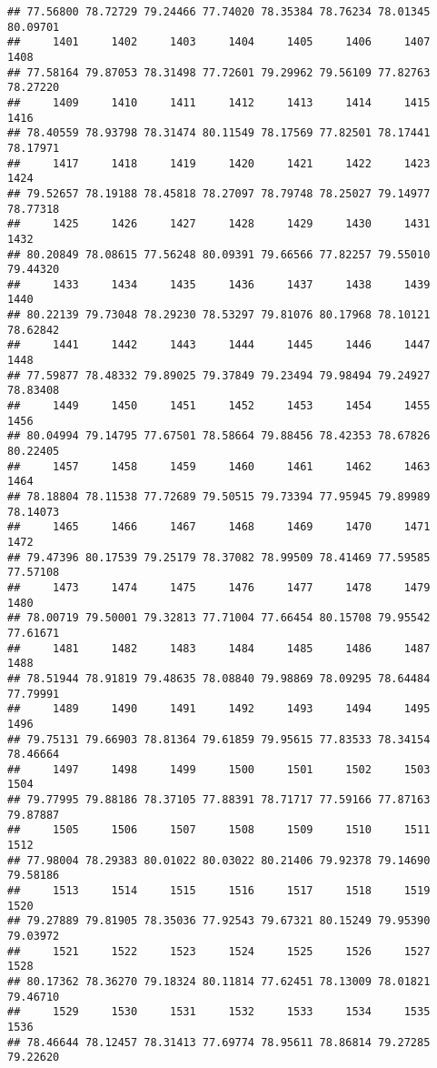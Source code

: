 \documentclass[
]{article}
\begin{document}
\begin{verbatim}
## 77.56800 78.72729 79.24466 77.74020 78.35384 78.76234 78.01345 80.09701 
##     1401     1402     1403     1404     1405     1406     1407     1408 
## 77.58164 79.87053 78.31498 77.72601 79.29962 79.56109 77.82763 78.27220 
##     1409     1410     1411     1412     1413     1414     1415     1416 
## 78.40559 78.93798 78.31474 80.11549 78.17569 77.82501 78.17441 78.17971 
##     1417     1418     1419     1420     1421     1422     1423     1424 
## 79.52657 78.19188 78.45818 78.27097 78.79748 78.25027 79.14977 78.77318 
##     1425     1426     1427     1428     1429     1430     1431     1432 
## 80.20849 78.08615 77.56248 80.09391 79.66566 77.82257 79.55010 79.44320 
##     1433     1434     1435     1436     1437     1438     1439     1440 
## 80.22139 79.73048 78.29230 78.53297 79.81076 80.17968 78.10121 78.62842 
##     1441     1442     1443     1444     1445     1446     1447     1448 
## 77.59877 78.48332 79.89025 79.37849 79.23494 79.98494 79.24927 78.83408 
##     1449     1450     1451     1452     1453     1454     1455     1456 
## 80.04994 79.14795 77.67501 78.58664 79.88456 78.42353 78.67826 80.22405 
##     1457     1458     1459     1460     1461     1462     1463     1464 
## 78.18804 78.11538 77.72689 79.50515 79.73394 77.95945 79.89989 78.14073 
##     1465     1466     1467     1468     1469     1470     1471     1472 
## 79.47396 80.17539 79.25179 78.37082 78.99509 78.41469 77.59585 77.57108 
##     1473     1474     1475     1476     1477     1478     1479     1480 
## 78.00719 79.50001 79.32813 77.71004 77.66454 80.15708 79.95542 77.61671 
##     1481     1482     1483     1484     1485     1486     1487     1488 
## 78.51944 78.91819 79.48635 78.08840 79.98869 78.09295 78.64484 77.79991 
##     1489     1490     1491     1492     1493     1494     1495     1496 
## 79.75131 79.66903 78.81364 79.61859 79.95615 77.83533 78.34154 78.46664 
##     1497     1498     1499     1500     1501     1502     1503     1504 
## 79.77995 79.88186 78.37105 77.88391 78.71717 77.59166 77.87163 79.87887 
##     1505     1506     1507     1508     1509     1510     1511     1512 
## 77.98004 78.29383 80.01022 80.03022 80.21406 79.92378 79.14690 79.58186 
##     1513     1514     1515     1516     1517     1518     1519     1520 
## 79.27889 79.81905 78.35036 77.92543 79.67321 80.15249 79.95390 79.03972 
##     1521     1522     1523     1524     1525     1526     1527     1528 
## 80.17362 78.36270 79.18324 80.11814 77.62451 78.13009 78.01821 79.46710 
##     1529     1530     1531     1532     1533     1534     1535     1536 
## 78.46644 78.12457 78.31413 77.69774 78.95611 78.86814 79.27285 79.22620 

\end{verbatim}
\end{document}
